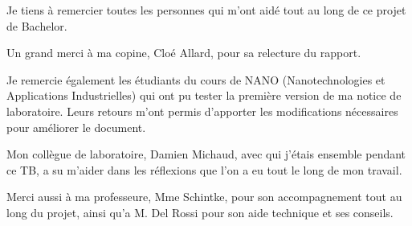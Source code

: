 Je tiens à remercier toutes les personnes qui m'ont aidé tout au long de ce projet de Bachelor.

Un grand merci à ma copine, Cloé Allard, pour sa relecture du rapport.

Je remercie également les étudiants du cours de NANO (Nanotechnologies et Applications Industrielles) qui ont pu tester la première version de ma notice de laboratoire. Leurs retours m'ont permis d'apporter les modifications nécessaires pour améliorer le document.

Mon collègue de laboratoire, Damien Michaud, avec qui j'étais ensemble pendant ce TB, a su m'aider dans les réflexions que l'on a eu tout le long de mon travail.

Merci aussi à ma professeure, Mme Schintke, pour son accompagnement tout au long du projet, ainsi qu'a M. Del Rossi pour son aide technique et ses conseils.